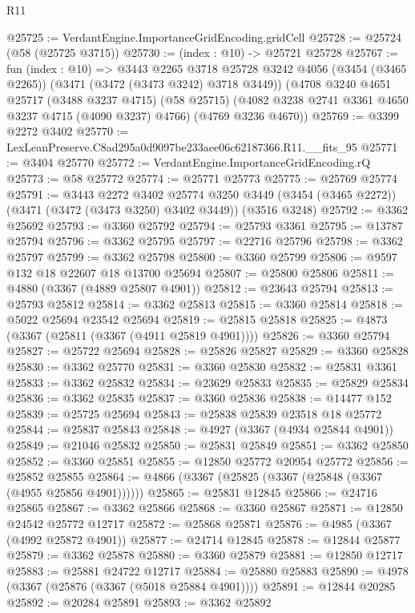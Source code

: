 \begin{lexlean}{R11}
\begin{coremodule}
@25725 := VerdantEngine.ImportanceGridEncoding.gridCell
@25728 := @25724 (@58 (@25725 @3715))
@25730 := (index : @10) -> @25721 @25728
@25767 := fun (index : @10) =>
  @3443
    @2265
    @3718
    @25728
    @3242
    @4056
    (@3454 (@3465 @2265))
    (@3471 (@3472 (@3473 @3242) @3718 @3449))
    (@4708
      @3240
      @4651
      @25717
      (@3488 @3237 @4715)
      (@58 @25715)
      (@4082 @3238 @2741 @3361 @4650 @3237 @4715 (@4090 @3237) @4766)
      (@4769 @3236 @4670))
@25769 := @3399 @2272 @3402
@25770 := LexLeanPreserve.C8ad295a0d9097be233aee06c62187366.R11.__fits_95
@25771 := @3404 @25770
@25772 := VerdantEngine.ImportanceGridEncoding.rQ
@25773 := @58 @25772
@25774 := @25771 @25773
@25775 := @25769 @25774
@25791 := @3443
    @2272
    @3402
    @25774
    @3250
    @3449
    (@3454 (@3465 @2272))
    (@3471 (@3472 (@3473 @3250) @3402 @3449))
    (@3516 @3248)
@25792 := @3362 @25692
@25793 := @3360 @25792
@25794 := @25793 @3361
@25795 := @13787 @25794
@25796 := @3362 @25795
@25797 := @22716 @25796
@25798 := @3362 @25797
@25799 := @3362 @25798
@25800 := @3360 @25799
@25806 := @9597 @132 @18 @22607 @18 @13700 @25694
@25807 := @25800 @25806
@25811 := @4880 (@3367 (@4889 @25807 @4901))
@25812 := @23643 @25794
@25813 := @25793 @25812
@25814 := @3362 @25813
@25815 := @3360 @25814
@25818 := @5022 @25694 @23542 @25694
@25819 := @25815 @25818
@25825 := @4873 (@3367 (@25811 (@3367 (@4911 @25819 @4901))))
@25826 := @3360 @25794
@25827 := @25722 @25694
@25828 := @25826 @25827
@25829 := @3360 @25828
@25830 := @3362 @25770
@25831 := @3360 @25830
@25832 := @25831 @3361
@25833 := @3362 @25832
@25834 := @23629 @25833
@25835 := @25829 @25834
@25836 := @3362 @25835
@25837 := @3360 @25836
@25838 := @14477 @152
@25839 := @25725 @25694
@25843 := @25838 @25839 @23518 @18 @25772
@25844 := @25837 @25843
@25848 := @4927 (@3367 (@4934 @25844 @4901))
@25849 := @21046 @25832
@25850 := @25831 @25849
@25851 := @3362 @25850
@25852 := @3360 @25851
@25855 := @12850 @25772 @20954 @25772
@25856 := @25852 @25855
@25864 := @4866 (@3367 (@25825 (@3367 (@25848 (@3367 (@4955 @25856 @4901))))))
@25865 := @25831 @12845
@25866 := @24716 @25865
@25867 := @3362 @25866
@25868 := @3360 @25867
@25871 := @12850 @24542 @25772 @12717
@25872 := @25868 @25871
@25876 := @4985 (@3367 (@4992 @25872 @4901))
@25877 := @24714 @12845
@25878 := @12844 @25877
@25879 := @3362 @25878
@25880 := @3360 @25879
@25881 := @12850 @12717
@25883 := @25881 @24722 @12717
@25884 := @25880 @25883
@25890 := @4978 (@3367 (@25876 (@3367 (@5018 @25884 @4901))))
@25891 := @12844 @20285
@25892 := @20284 @25891
@25893 := @3362 @25892

\end{coremodule}
\end{lexlean}
